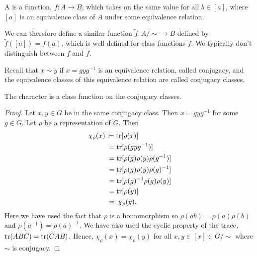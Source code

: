 \begin{dfn}{}{}
    A  is a function, \(f \colon A \to B\),
    which takes on the same value for all \(b \in [a]\), where \([a]\) is an
    equivalence class of \(A\) under some equivalence relation.
    
    We can therefore define a similar function \(\tilde{f} \colon A/\sim \to
    B\) defined by \(\tilde{f}([a]) = f(a)\), which is well defined for class
    functions \(f\).
    We typically don't distinguish between \(f\) and \(\tilde{f}\).
\end{dfn}

Recall that \(x \sim y\) if \(x = gyg^{-1}\) is an equivalence relation,
called conjugacy, and the equivalence classes of this equivalence relation are
called conjugacy classes.

\begin{lma}{}{}
    The character is a class function on the conjugacy classes.
    
    \begin{proof}
        Let \(x, y \in G\) be in the same conjugacy class.
        Then \(x = gyg^{-1}\) for some \(g \in G\).
        Let \(\rho\) be a representation of \(G\).
        Then
        \begin{align}
            \chi_{\rho}(x) &\coloneqq \operatorname{tr}[\rho(x)]\\
            &\hphantom{:}= \operatorname{tr}[\rho(gyg^{-1})]\\
            &\hphantom{:}= \operatorname{tr}[\rho(g)\rho(y)\rho(g^{-1})]\\
            &\hphantom{:}= \operatorname{tr}[\rho(g)\rho(y)\rho(g)^{-1}]\\
            &\hphantom{:}= \operatorname{tr}[\rho(g)^{-1}\rho(g)\rho(y)]\\
            &\hphantom{:}= \operatorname{tr}[\rho(y)]\\
            &\hphantom{:}\eqqcolon \chi_\rho(y).
        \end{align}
        Here we have used the fact that \(\rho\) is a homomorphism so
        \(\rho(ab) = \rho(a)\rho(b)\) and \(\rho(a^{-1}) = \rho(a)^{-1}\).
        We have also used the cyclic property of the trace, \(\operatorname{tr}(ABC) =
        \operatorname{tr}(CAB)\).
        Hence, \(\chi_\rho(x) = \chi_\rho(y)\) for all \(x, y \in [x] \in
        G/\sim\) where \(\sim\) is conjugacy.
    \end{proof}
\end{lma}

